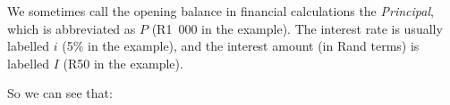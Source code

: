       \label{m39332*id69469}We sometimes call the opening balance in financial calculations the \textsl{Principal}, which is abbreviated as \begin{math}P\end{math} (R1~000 in the example). The interest rate is usually labelled \begin{math}i\end{math} (5\% in the example), and the interest amount (in Rand terms) is labelled \begin{math}I\end{math} (R50 in the example).\par 
      \label{m39332*id69507}So we can see that:\par 
      \label{m39332*uid28}\nopagebreak\noindent{}
    
